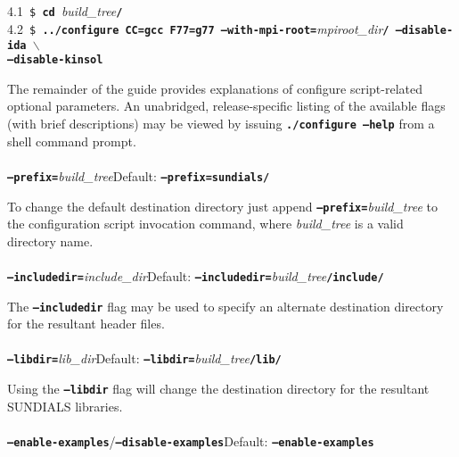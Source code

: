 \documentclass[10pt]{report}
\begin{document}
\\
\\
\small 4.1\normalsize\texttt{ \$\textbf{ cd }}\textit{build\_tree}\texttt{\textbf{/}} \\
\small 4.2\normalsize\texttt{ \$\textbf{ ../configure CC=gcc F77=g77 --with-mpi-root=}}\textit{mpiroot\_dir}\texttt{\textbf{/ --disable-ida  $\backslash$}} \\
\hspace*{3.5ex}\texttt{\textbf{--disable-kinsol}}
\\ \setlength{\parindent}{0.5cm}

The remainder of the guide provides explanations of configure script-related optional parameters.  An unabridged, release-specific listing of the available flags (with brief descriptions) may be viewed by issuing \texttt{\textbf{./configure --help}} from a shell command prompt.
\\
\\
\texttt{\textbf{--prefix=}}\textit{build\_tree}\hspace{0.5in}Default: \texttt{\textbf{--prefix=sundials/}}\vspace{0.05in}

To change the default destination directory just append \texttt{\textbf{--prefix=}}\textit{build\_tree} to the configuration script invocation command, where \textit{build\_tree} is a valid directory name.
\\
\\
\texttt{\textbf{--includedir=}}\textit{include\_dir}\hspace{0.5in}Default: \texttt{\textbf{--includedir=}}\textit{build\_tree}\texttt{\textbf{/include/}}\vspace{0.05in}

The \texttt{\textbf{--includedir}} flag may be used to specify an alternate destination directory for the resultant header files.
\\
\\
\texttt{\textbf{--libdir=}}\textit{lib\_dir}\hspace{0.5in}Default: \texttt{\textbf{--libdir=}}\textit{build\_tree}\texttt{\textbf{/lib/}}\vspace{0.05in}

Using the \texttt{\textbf{--libdir}} flag will change the destination directory for the resultant \small SUNDIALS \normalsize libraries.
\\
\\
\texttt{\textbf{--enable-examples}}/\texttt{\textbf{--disable-examples}}\hspace{0.5in}Default: \texttt{\textbf{--enable-examples}}\vspace{0.05in}
\end{document}
